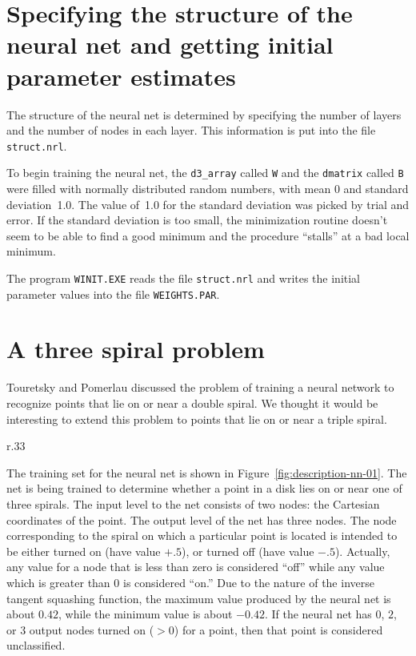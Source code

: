 \documentclass{admbmanual}
\begin{document}
\section{Specifying the structure of the neural net\br
  and getting initial parameter estimates}

The structure of the neural net is determined by specifying the number of layers
and the number of nodes in each layer. This information is put into the file
\texttt{struct.nrl}.

To begin training the neural net, the \texttt{d3\_array} called \texttt{W} and
the \texttt{dmatrix} called \texttt{B} were filled with normally distributed
random numbers, with mean 0 and standard deviation~1.0. The value of~1.0 for the
standard deviation was picked by trial and error. If the standard deviation is
too small, the minimization routine doesn't seem to be able to find a good
minimum and the procedure ``stalls'' at a bad local minimum.

The program \texttt{WINIT.EXE} reads the file \texttt{struct.nrl} and writes the
initial parameter values into the file \texttt{WEIGHTS.PAR}.

\section{A three spiral problem}

Touretsky and Pomerlau \cite{touretzkypomerlau1989} discussed the problem of
training a neural network to recognize points that lie on or near a double
spiral. We thought it would be interesting to extend this problem to points that
lie on or near a triple spiral.

\begin{wrapfigure}{r}{.33\textwidth}%
      \centering
        { \par}%
      \emptycaption{}%
      \label{fig:description-nn-01}
\end{wrapfigure}

The training set for the neural net is shown in
Figure~\ref{fig:description-nn-01}. %
The net is being trained to determine whether a point in a disk lies on or near
one of three spirals. The input level to the net consists of two nodes: the
Cartesian coordinates of the point. The output level of the net has three nodes.
The node corresponding to the spiral on which a particular point is located is
intended to be either turned on (have value $+.5$), or turned off (have value
$-.5$). Actually, any value for a node that is less than zero is considered
``off'' while any value which is greater than $0$ is considered ``on.'' Due to
the nature of the inverse tangent squashing function, the maximum value produced
by the neural net is about $0.42$, while the minimum value is about $-0.42$. If
the neural net has $0$, $2$, or $3$ output nodes turned on ($>0$) for a point,
then that point is considered unclassified.
\end{document}
